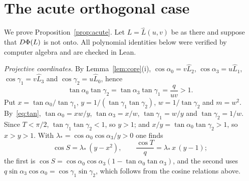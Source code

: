 \section{The acute orthogonal case}\label{sec:elimination}

We prove Proposition~\ref{prop:acute}. Let $L=\hat L(u,v)$ be as there and
suppose that $D\Phi(L)$ is not onto. All polynomial identities below were
verified by computer algebra and are checked in Lean.

\emph{Projective coordinates.} By Lemma~\ref{lem:core}(i),
$\cos\alpha_0=v\hat L_2$, $\cos\alpha_3=u\hat L_1$, $\cos\gamma_1=v\hat L_3$ and
$\cos\gamma_2=u\hat L_0$, hence
\begin{equation}\label{eq:tan}
  \tan\alpha_0\tan\gamma_2=\tan\alpha_3\tan\gamma_1=\frac{q}{uv}>1 .
\end{equation}
Put $x=\tan\alpha_0/\tan\gamma_1$, $y=1/(\tan\gamma_1\tan\gamma_2)$,
$w=1/\tan\gamma_2$ and $m=w^2$. By~\eqref{eq:tan}, $\tan\alpha_0=xw/y$,
$\tan\alpha_3=x/w$, $\tan\gamma_1=w/y$ and $\tan\gamma_2=1/w$. Since
$T<\pi/2$, $\tan\gamma_1\tan\gamma_2<1$, so $y>1$; and
$x/y=\tan\alpha_0\tan\gamma_2>1$, so $x>y>1$. With
$\lambda_*=\cos\alpha_0\cos\alpha_3/y>0$ one finds
\begin{equation}\label{eq:cos}
  \cos S=\lambda_*\,(y-x^2),\qquad \frac{\cos T}{q}=\lambda_*\,x\,(y-1);
\end{equation}
the first is $\cos S=\cos\alpha_0\cos\alpha_3(1-\tan\alpha_0\tan\alpha_3)$, and
the second uses $q\sin\alpha_3\cos\alpha_0=\cos\gamma_1\sin\gamma_2$, which
follows from the cosine relations above.

